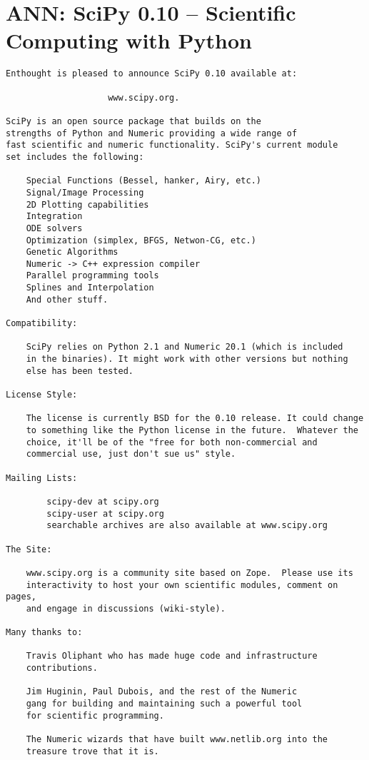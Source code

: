 \newpage
\section*{ANN: SciPy 0.10 -- Scientific Computing with Python}

\begin{verbatim}
Enthought is pleased to announce SciPy 0.10 available at:

                    www.scipy.org.

SciPy is an open source package that builds on the
strengths of Python and Numeric providing a wide range of
fast scientific and numeric functionality. SciPy's current module
set includes the following:

    Special Functions (Bessel, hanker, Airy, etc.)
    Signal/Image Processing
    2D Plotting capabilities
    Integration
    ODE solvers
    Optimization (simplex, BFGS, Netwon-CG, etc.)
    Genetic Algorithms
    Numeric -> C++ expression compiler
    Parallel programming tools
    Splines and Interpolation
    And other stuff.

Compatibility:

    SciPy relies on Python 2.1 and Numeric 20.1 (which is included
    in the binaries). It might work with other versions but nothing
    else has been tested.

License Style:

    The license is currently BSD for the 0.10 release. It could change
    to something like the Python license in the future.  Whatever the
    choice, it'll be of the "free for both non-commercial and
    commercial use, just don't sue us" style.

Mailing Lists:

        scipy-dev at scipy.org
        scipy-user at scipy.org
        searchable archives are also available at www.scipy.org

The Site:

    www.scipy.org is a community site based on Zope.  Please use its
    interactivity to host your own scientific modules, comment on pages,
    and engage in discussions (wiki-style).

Many thanks to:

    Travis Oliphant who has made huge code and infrastructure
    contributions.

    Jim Huginin, Paul Dubois, and the rest of the Numeric
    gang for building and maintaining such a powerful tool
    for scientific programming.

    The Numeric wizards that have built www.netlib.org into the
    treasure trove that it is.


\end{verbatim}
